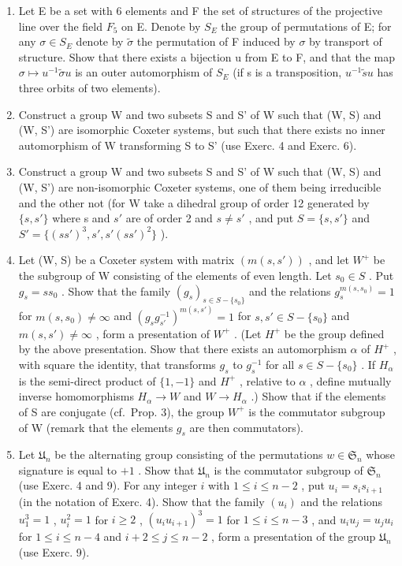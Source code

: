 \begin{enumerate}
\def\labelenumi{\arabic{enumi})}
\setcounter{enumi}{5}
\item
  Let E be a set with 6 elements and F the set of structures of the projective line over the field \(F_{5}\) on E. Denote by \(S_{E}\) the group of permutations of E; for any \(\sigma \in S_{E}\) denote by \(\tilde{\sigma}\) the permutation of F induced by \(\sigma\) by transport of structure. Show that there exists a bijection u from E to F, and that the map \(\sigma \mapsto u^{-1}\tilde{\sigma}u\) is an outer automorphism of \(S_{E}\) (if s is a transposition, \(u^{-1}\tilde{s}u\) has three orbits of two elements).
\item
  Construct a group W and two subsets S and S' of W such that (W, S) and (W, S') are isomorphic Coxeter systems, but such that there exists no inner automorphism of W transforming S to S' (use Exerc. 4 and Exerc. 6).
\item
  Construct a group W and two subsets S and S' of W such that (W, S) and (W, S') are non-isomorphic Coxeter systems, one of them being irreducible and the other not (for W take a dihedral group of order 12 generated by \(\{s, s'\}\) where s and \(s'\) are of order 2 and \(s \neq s'\) , and put \(S = \{s, s'\}\) and \(S' = \{(ss')^3, s', s'(ss')^2\}\) ).
\item
  Let (W, S) be a Coxeter system with matrix \((m(s, s'))\) , and let \(W^{+}\) be the subgroup of W consisting of the elements of even length. Let \(s_{0} \in S\) . Put \(g_{s} = ss_{0}\) . Show that the family \((g_{s})_{s \in S - \{s_{0}\}}\) and the relations \(g_{s}^{m(s, s_{0})} = 1\) for \(m(s, s_{0}) \neq \infty\) and \((g_{s} g_{s'}^{-1})^{m(s, s')} = 1\) for \(s, s' \in S - \{s_{0}\}\) and \(m(s, s') \neq \infty\) , form a presentation of \(W^{+}\) . (Let \(H^{+}\) be the group defined by the above presentation. Show that there exists an automorphism \(\alpha\) of \(H^{+}\) , with square the identity, that transforms \(g_{s}\) to \(g_{s}^{-1}\) for all \(s \in S - \{s_{0}\}\) . If \(H_{\alpha}\) is the semi-direct product of \(\{1, -1\}\) and \(H^{+}\) , relative to \(\alpha\) , define mutually inverse homomorphisms \(H_{\alpha} \to W\) and \(W \to H_{\alpha}\) .) Show that if the elements of S are conjugate (cf.~Prop. 3), the group \(W^{+}\) is the commutator subgroup of W (remark that the elements \(g_{s}\) are then commutators).
\item
  Let \(\mathfrak{U}_n\) be the alternating group consisting of the permutations \(w \in \mathfrak{S}_n\) whose signature is equal to \(+1\) . Show that \(\mathfrak{U}_n\) is the commutator subgroup of \(\mathfrak{S}_n\) (use Exerc. 4 and 9). For any integer \(i\) with \(1 \leqslant i \leqslant n - 2\) , put \(u_i = s_i s_{i+1}\) (in the notation of Exerc. 4). Show that the family \((u_i)\) and the relations \(u_1^3 = 1\) , \(u_i^2 = 1\) for \(i \geqslant 2\) , \((u_i u_{i+1})^3 = 1\) for \(1 \leqslant i \leqslant n - 3\) , and \(u_i u_j = u_j u_i\) for \(1 \leqslant i \leqslant n - 4\) and \(i + 2 \leqslant j \leqslant n - 2\) , form a presentation of the group \(\mathfrak{U}_n\) (use Exerc. 9).
\end{enumerate}

